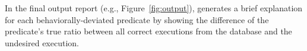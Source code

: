 In the final output report (e.g., Figure~\ref{fig:output}), \ourtool 
generates a brief explanation for each behaviorally-deviated predicate
by showing the difference of the predicate's true ratio between
all correct executions from the database and the undesired execution.





